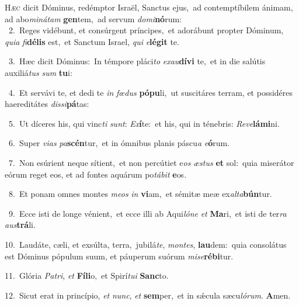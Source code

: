 \lettrine{\initial\textcolor{\initialcolor}{H}}{æc} dicit Dóminus, redémptor Israël, Sanctus ejus,~\dagger ad contemptíbilem ánimam, ad abo\-\textit{mi}\-\textit{ná}\textit{tam} \textbf{gen}\-tem,~\star ad servum \textit{do}\-\textit{mi}\textbf{nó}rum:\\
{\numbfont\textcolor{\numbcolor}{~2.}}~Reges vidébunt, et consúrgent príncipes,~\dagger et adorábunt propter Dóminum, \textit{qui}\-\textit{a} \textit{fi}\-\textbf{dé}\textbf{lis} est,~\star et Sanctum Israel, \textit{qui} \textit{e}\-\textbf{lé}\textbf{git} te.\par
{\numbfont\textcolor{\numbcolor}{~3.}}~Hæc dicit Dóminus:~\dagger In témpore pláci\textit{to} \textit{ex}\-\textit{au}\textbf{dí}\textbf{vi} te,~\star et in die salútis auxiliá\textit{tus} \textit{sum} \textbf{tu}\-i:\par
{\numbfont\textcolor{\numbcolor}{~4.}}~Et servávi te, et dedi te \textit{in} \textit{fœ}\-\textit{dus} \textbf{pó}\-\textbf{pu}li,~\star ut suscitáres terram, et possidéres haereditátes \textit{dis}\-\textit{si}\textbf{pá}tas:\par
{\numbfont\textcolor{\numbcolor}{~5.}}~Ut díceres his, qui vinc\textit{ti} \textit{sunt}\-: \textit{Ex}\-\textbf{í}te:~\star et his, qui in ténebris: \textit{Re}\-\textit{ve}\textbf{lá}\textbf{mi}ni.\par
{\numbfont\textcolor{\numbcolor}{~6.}}~Super \textit{vi}\-\textit{as} \textit{pa}\-\textbf{scén}tur,~\star et in ómnibus planis páscu\textit{a} \textit{e}\-\textbf{ó}rum.\par
{\numbfont\textcolor{\numbcolor}{~7.}}~Non esúrient neque sítient,~\dagger et non percútiet e\textit{os} \textit{æs}\-\textit{tus} \textbf{et} sol:~\star quia miserátor eórum reget eos, et ad fontes aquárum po\-\textit{tá}\-\textit{bit} \textbf{e}\-os.\par
{\numbfont\textcolor{\numbcolor}{~8.}}~Et ponam omnes montes \textit{me}\-\textit{os} \textit{in} \textbf{vi}\-am,~\star et sémitæ meæ ex\-\textit{al}\-\textit{ta}\textbf{bún}tur.\par
{\numbfont\textcolor{\numbcolor}{~9.}}~Ecce isti de longe vénient,~\dagger et ecce illi ab Aqui\-\textit{ló}\-\textit{ne} \textit{et} \textbf{Ma}\-ri,~\star et isti de ter\textit{ra} \textit{aus}\-\textbf{trá}li.\par
{\numbfont\textcolor{\numbcolor}{10.}}~Laudáte, cæli, et exsúlta, terra,~\dagger jubilá\-\textit{te}\-, \textit{mon}\-\textit{tes}, \textbf{lau}\-dem:~\star quia consolátus est Dóminus pópulum suum, et páuperum suórum \textit{mi}\-\textit{se}\textbf{ré}\textbf{bi}tur.\par
{\numbfont\textcolor{\numbcolor}{11.}}~Glória \textit{Pa}\-\textit{tri}, \textit{et} \textbf{Fí}\-\textbf{li}o,~\star et Spirí\-\textit{tu}\-\textit{i} \textbf{Sanc}\-to.\par
{\numbfont\textcolor{\numbcolor}{12.}}~Sicut erat in princípio, \textit{et} \textit{nunc}\-, \textit{et} \textbf{sem}\-per,~\star et in sǽcula sæcu\-\textit{ló}\-\textit{rum}. \textbf{A}\-men.\par
